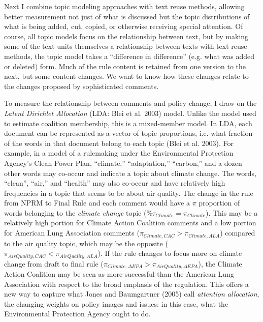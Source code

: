 Next I combine topic modeling approaches with text reuse methods, allowing better measurement not just of what is discussed but the topic distributions of what is being added, cut, copied, or otherwise receiving special attention. 
Of course, all topic models focus on the relationship between text, but by making some of the text units themselves a relationship between texts with text reuse methods, the topic model takes a ``difference in difference'' (e.g. what was added or deleted) %
form. Much of the rule content is retained from one version to the next, but some content changes. We want to know how these changes relate to the changes proposed by sophisticated comments. 



To measure the relationship between comments and policy change, I draw on the \textit{Latent Dirichlet Allocation} (LDA: Blei et al. 2003) model. Unlike the model used to estimate coalition membership, this is a mixed-member model. In LDA, each document can be represented as a vector of topic proportions, i.e. what fraction of the words in that document belong to each topic (Blei et al. 2003). For example, in a model of a rulemaking under the Environmental Protection Agency's Clean Power Plan, ``climate,'' ``adaptation,'' ``carbon,'' and a dozen other words may co-occur and indicate a topic about climate change. The words, ``clean'', ``air,'' and ``health'' may also co-occur and have relatively high frequencies in a topic that seems to be about air quality.  The change in the rule from NPRM to Final Rule and each comment would have a $\pi$ proportion of words belonging to the \textit{climate change} topic (\%$\tau_{Climate}=\pi_{Climate}$). This may be a relatively high portion for Climate Action Coalition comments and a low portion for American Lung Association comments ($\pi_{Climate, CAC} > \pi_{Climate, ALA}$) compared to the air quality topic, which may be the opposite ($\pi_{AirQuality, CAC} < \pi_{AirQuality, ALA}$). If the rule changes to focus more on climate change from draft to final rule ($\pi_{Climate, \Delta EPA} > \pi_{AirQuality, \Delta EPA}$), the Climate Action Coalition may be seen as more successful than the American Lung Association with respect to the broad emphasis of the regulation. This offers a new way to capture what Jones and Baumgartner (2005) call \textit{attention allocation}, the changing weights on policy images and issues: in this case, what the Environmental Protection Agency ought to do.

